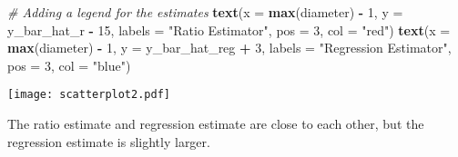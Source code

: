 \documentclass[]{article}
\newenvironment{Shaded}{\begin{snugshade}}{\end{snugshade}}
\newcommand{\AttributeTok}[1]{\textcolor[rgb]{0.13,0.29,0.53}{#1}}
\newcommand{\CommentTok}[1]{\textcolor[rgb]{0.56,0.35,0.01}{\textit{#1}}}
\newcommand{\DecValTok}[1]{\textcolor[rgb]{0.00,0.00,0.81}{#1}}
\newcommand{\FunctionTok}[1]{\textcolor[rgb]{0.13,0.29,0.53}{\textbf{#1}}}
\newcommand{\NormalTok}[1]{#1}
\newcommand{\SpecialCharTok}[1]{\textcolor[rgb]{0.81,0.36,0.00}{\textbf{#1}}}
\newcommand{\StringTok}[1]{\textcolor[rgb]{0.31,0.60,0.02}{#1}}
\begin{document}
\begin{enumerate}[label=(\alph*)]
\begin{Shaded}
\begin{Highlighting}[]
\CommentTok{\# Adding a legend for the estimates}
\FunctionTok{text}\NormalTok{(}\AttributeTok{x =} \FunctionTok{max}\NormalTok{(diameter) }\SpecialCharTok{{-}} \DecValTok{1}\NormalTok{, }\AttributeTok{y =}\NormalTok{ y\_bar\_hat\_r }\SpecialCharTok{{-}} \DecValTok{15}\NormalTok{, }
    \AttributeTok{labels =} \StringTok{"Ratio Estimator"}\NormalTok{, }\AttributeTok{pos =} \DecValTok{3}\NormalTok{, }\AttributeTok{col =} \StringTok{"red"}\NormalTok{)}
\FunctionTok{text}\NormalTok{(}\AttributeTok{x =} \FunctionTok{max}\NormalTok{(diameter) }\SpecialCharTok{{-}} \DecValTok{1}\NormalTok{, }\AttributeTok{y =}\NormalTok{ y\_bar\_hat\_reg }\SpecialCharTok{+} \DecValTok{3}\NormalTok{, }
    \AttributeTok{labels =} \StringTok{"Regression Estimator"}\NormalTok{, }\AttributeTok{pos =} \DecValTok{3}\NormalTok{, }\AttributeTok{col =} \StringTok{"blue"}\NormalTok{)}
\end{Highlighting}
\end{Shaded}

\texttt{[image: scatterplot2.pdf]}

The ratio estimate and regression estimate are close to each other, but the regression estimate is slightly larger.

\end{enumerate}
\end{document}
